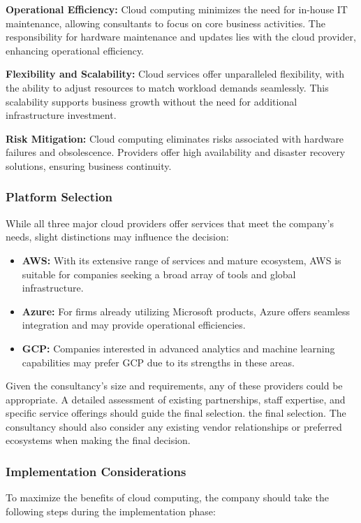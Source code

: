 \documentclass{article}
\begin{document}
\textbf{Operational Efficiency:} Cloud computing minimizes the need for in-house IT maintenance, allowing consultants to focus on core business activities. The responsibility for hardware maintenance and updates lies with the cloud provider, enhancing operational efficiency.

\textbf{Flexibility and Scalability:} Cloud services offer unparalleled flexibility, with the ability to adjust resources to match workload demands seamlessly. This scalability supports business growth without the need for additional infrastructure investment.

\textbf{Risk Mitigation:} Cloud computing eliminates risks associated with hardware failures and obsolescence. Providers offer high availability and disaster recovery solutions, ensuring business continuity.

\subsubsection{Platform Selection}
While all three major cloud providers offer services that meet the company's needs, slight distinctions may influence the decision:
\begin{itemize}
    \item \textbf{AWS:} With its extensive range of services and mature ecosystem, AWS is suitable for companies seeking a broad array of tools and global infrastructure.
    \item \textbf{Azure:} For firms already utilizing Microsoft products, Azure offers seamless integration and may provide operational efficiencies.
    \item \textbf{GCP:} Companies interested in advanced analytics and machine learning capabilities may prefer GCP due to its strengths in these areas.
\end{itemize}
Given the consultancy's size and requirements, any of these providers could be appropriate. A detailed assessment of existing partnerships, staff expertise, and specific service offerings should guide the final selection. the final selection. The consultancy should also consider any existing vendor relationships or preferred ecosystems when making the final decision.

\subsubsection{Implementation Considerations}
To maximize the benefits of cloud computing, the company should take the following steps during the implementation phase:
\end{document}
